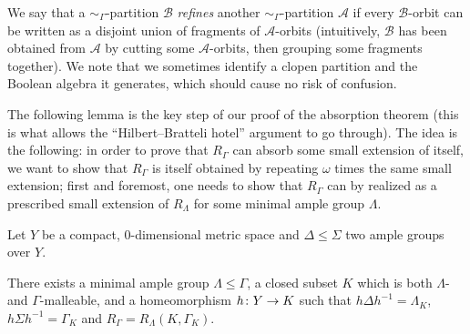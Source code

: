\documentclass[AHL,Unicode]{cedram}
\newcommand{\mcA}{\mathcal{A}}
\newcommand{\mcB}{\mathcal{B}}
\newcounter{setofstep}
\newcounter{step}[setofstep]
\renewcommand*{\to}{\mathchoice{\longrightarrow}{\rightarrow}{\rightarrow}{\rightarrow}}
\begin{document}
We say that a $\sim_\Gamma$-partition $\mcB$ \emph{refines} another $\sim_\Gamma$-partition $\mcA$ if every $\mcB$-orbit can be written as a disjoint union of fragments of $\mcA$-orbits (intuitively, $\mcB$ has been obtained from $\mcA$ by cutting some $\mcA$-orbits, then grouping some fragments together). We note that we sometimes identify a clopen partition and the Boolean algebra it generates, which should cause no risk of confusion.



The following lemma is the key step of our proof of the absorption theorem (this is what allows the ``Hilbert--Bratteli hotel'' argument to go through). The idea is the following: in order to prove that $R_\Gamma$ can absorb some small extension of itself, we want to show that $R_\Gamma$ is itself obtained by repeating $\omega$ times the same small extension; first and foremost, one needs to show that $R_\Gamma$ can by realized as a prescribed small extension of $R_\Lambda$ for some minimal ample group $\Lambda$.

\begin{lemm}\label{l:everyone_is_a_small_extension}
Let $Y$ be a compact, $0$-dimensional metric space and $\Delta \le \Sigma$ two ample groups over $Y$.

There exists a minimal ample group $\Lambda \le \Gamma$, a closed subset $K$ which is both $\Lambda$- and $\Gamma$-malleable, and a homeomorphism $h \colon Y \to K$ such that $h \Delta h^{-1} = \Lambda_K$, $h \Sigma h^{-1} = \Gamma_K $ and $R_\Gamma=R_\Lambda(K,\Gamma_K)$.
\end{lemm}
\end{document}
